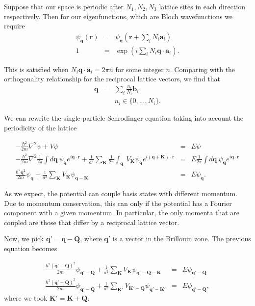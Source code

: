 \documentclass{article}
\theoremstyle{definition}
\begin{document}
Suppose that our space is periodic after $N_1, N_2, N_3$ lattice sites in each direction respectively. Then for our eigenfunctions, which are Bloch wavefunctions we require 
\begin{eqnarray}
\psi_\mathbf{q}(\mathbf{r}) &=& \psi_\mathbf{q}\left(\mathbf{r} + \sum_i N_i\mathbf{a}_i\right) \\
1 &=& \exp\left(i \sum_i N_i \mathbf{q} \cdot\mathbf{a}_i \right).
\end{eqnarray}

This is satisfied when $N_i \mathbf{q} \cdot \mathbf{a}_i = 2\pi n$ for some integer $n$. Comparing with the orthogonality relationship for the reciprocal lattice vectors, we find that
\begin{eqnarray}
\mathbf{q} &=& \sum_i \frac{n_i}{N_i} \mathbf{b}_i \\
&& n_i \in \{0, ..., N_i \}.
\end{eqnarray}

We can rewrite the single-particle Schrodinger equation taking into account the periodicity of the lattice

\begin{eqnarray}
-\frac{\hbar^2}{2m} \nabla^2 \psi + V \psi &=& E \psi \\
-\frac{\hbar^2}{2m} \nabla^2 \frac{1}{2\pi} \int d\mathbf{q} \ \psi_\mathbf{q} e^{i \mathbf{q} \cdot \mathbf{r}} + \frac{1}{a^2} \sum_\mathbf{K} \frac{1}{2\pi} \int_\mathbf{q} \ V_\mathbf{K} \psi_\mathbf{q} e^{i (\mathbf{q} + \mathbf{K}) \cdot \mathbf{r}} &=& E \frac{1}{2\pi} \int d\mathbf{q} \ \psi_\mathbf{q} e^{i \mathbf{q} \cdot \mathbf{r}} \\
\frac{\hbar^2 \mathbf{q}^2}{2m} \psi_\mathbf{q} + \frac{1}{a^2} \sum_\mathbf{K} V_\mathbf{K} \psi_{\mathbf{q} - \mathbf{K}} &=& E \psi_\mathbf{q}.
\end{eqnarray}

As we expect, the potential can couple basis states with different momentum. Due to momentum conservation, this can only if the potential has a Fourier component with a given momentum. In particular, the only momenta that are coupled are those that differ by a reciprocal lattice vector.

Now, we pick $\mathbf{q}' = \mathbf{q} - \mathbf{Q}$, where $\mathbf{q}'$ is a vector in the Brillouin zone. The previous equation becomes

\begin{eqnarray}
\frac{\hbar^2 (\mathbf{q}' - \mathbf{Q})^2}{2m} \psi_{\mathbf{q}' - \mathbf{Q}} + \frac{1}{a^2} \sum_\mathbf{K} V_\mathbf{K} \psi_{\mathbf{q}' - \mathbf{Q} - \mathbf{K}} &=& E \psi_{\mathbf{q}' - \mathbf{Q}}\\
\frac{\hbar^2 (\mathbf{q}' - \mathbf{Q})^2}{2m} \psi_{\mathbf{q}' - \mathbf{Q}} + \frac{1}{a^2} \sum_{\mathbf{K}'} V_{\mathbf{K}' - \mathbf{Q}} \psi_{\mathbf{q}' - \mathbf{K}'} &=& E \psi_{\mathbf{q}' - \mathbf{Q}},
\end{eqnarray}
where we took $\mathbf{K}' = \mathbf{K} + \mathbf{Q}$.
\end{document}

